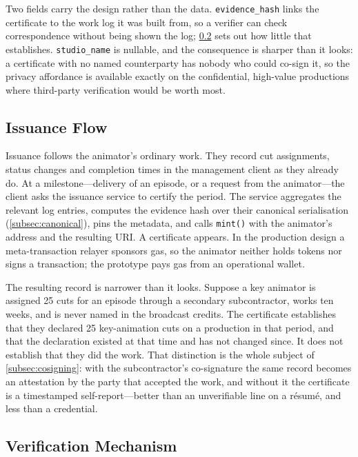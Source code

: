 Two fields carry the design rather than the data. \texttt{evidence\_hash} links the
certificate to the work log it was built from, so a verifier can check correspondence
without being shown the log; \cref{subsec:verification} sets out how little that
establishes. \texttt{studio\_name} is nullable, and the consequence is sharper than it
looks: a certificate with no named counterparty has nobody who could co-sign it, so the
privacy affordance is available exactly on the confidential, high-value productions
where third-party verification would be worth most.

\subsection{Issuance Flow}
\label{subsec:flow}

Issuance follows the animator's ordinary work. They record cut assignments, status
changes and completion times in the management client as they already do. At a
milestone---delivery of an episode, or a request from the animator---the client asks
the issuance service to certify the period. The service aggregates the relevant log
entries, computes the evidence hash over their canonical serialisation
(\cref{subsec:canonical}), pins the metadata, and calls \texttt{mint()} with the
animator's address and the resulting URI. A certificate appears. In the production
design a meta-transaction relayer sponsors gas, so the animator neither holds tokens
nor signs a transaction; the prototype pays gas from an operational wallet.

The resulting record is narrower than it looks. Suppose a key animator is assigned
25 cuts for an episode through a secondary subcontractor, works ten weeks, and is
never named in the broadcast credits. The certificate establishes that they
declared 25 key-animation cuts on a production in that period, and that the
declaration existed at that time and has not changed since. It does not establish
that they did the work. That distinction is the whole subject of
\cref{subsec:cosigning}: with the subcontractor's co-signature the same record
becomes an attestation by the party that accepted the work, and without it the
certificate is a timestamped self-report---better than an unverifiable line on a
r\'esum\'e, and less than a credential.

\subsection{Verification Mechanism}
\label{subsec:verification}

